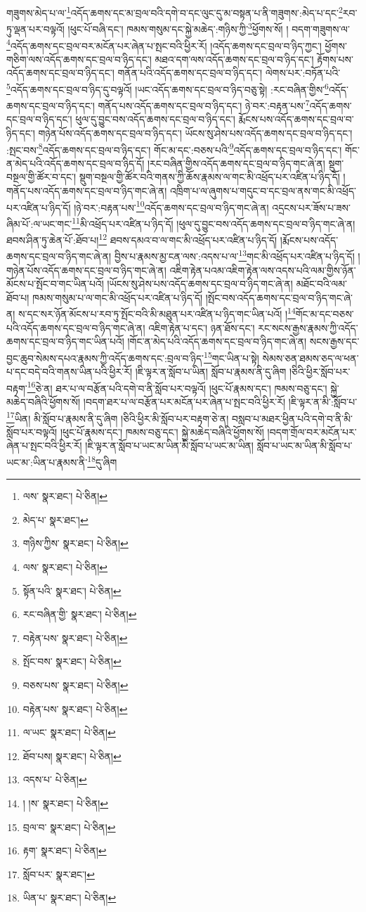 གཟུགས་མེད་པ་ལ་\footnote{ལས་  སྣར་ཐང་།  པེ་ཅིན། }འདོད་ཆགས་དང་མ་བྲལ་བའི་དགེ་བ་དང་ལུང་དུ་མ་བསྟན་པ་ནི་གཟུགས་:མེད་པ་དང་\footnote{མེད་པ་  སྣར་ཐང་། }རབ་ཏུ་ལྡན་པར་བལྟའོ། །ཕུང་པོ་བཞི་དང་། ཁམས་གསུམ་དང་སྐྱེ་མཆེད་:གཉིས་ཀྱི་\footnote{གཉིས་ཀྱིས་  སྣར་ཐང་།  པེ་ཅིན། }ཕྱོགས་སོ། །
བདག་གཟུགས་ལ་\footnote{ལས་  སྣར་ཐང་།  པེ་ཅིན། }འདོད་ཆགས་དང་བྲལ་བར་མངོན་པར་ཞེན་པ་སྤང་བའི་ཕྱིར་རོ། །འདོད་ཆགས་དང་བྲལ་བ་ཉིད་ཀྱང་། ཕྱོགས་གཅིག་ལས་འདོད་ཆགས་དང་བྲལ་བ་ཉིད་དང་། མཐའ་དག་ལས་འདོད་ཆགས་དང་བྲལ་བ་ཉིད་དང་། རྟོགས་པས་འདོད་ཆགས་དང་བྲལ་བ་ཉིད་དང་། གནོན་པའི་འདོད་ཆགས་དང་བྲལ་བ་ཉིད་དང་། ལེགས་པར་:བཏོན་པའི་\footnote{སྟོན་པའི་  སྣར་ཐང་།  པེ་ཅིན། }འདོད་ཆགས་དང་བྲལ་བ་ཉིད་དུ་བལྟའོ། །ཡང་འདོད་ཆགས་དང་བྲལ་བ་ཉིད་བཅུ་སྟེ། :རང་བཞིན་གྱིས་\footnote{རང་བཞིན་གྱི་  སྣར་ཐང་།  པེ་ཅིན། }འདོད་ཆགས་དང་བྲལ་བ་ཉིད་དང་། གནོད་པས་འདོད་ཆགས་དང་བྲལ་བ་ཉིད་དང་། ཉེ་བར་:བརྟན་པས་\footnote{བརྟེན་པས་  སྣར་ཐང་།  པེ་ཅིན། }འདོད་ཆགས་དང་བྲལ་བ་ཉིད་དང་། ཕུལ་དུ་བྱུང་བས་འདོད་ཆགས་དང་བྲལ་བ་ཉིད་དང་། རྨོངས་པས་འདོད་ཆགས་དང་བྲལ་བ་ཉིད་དང་། གཉེན་པོས་འདོད་ཆགས་དང་བྲལ་བ་ཉིད་དང་། ཡོངས་སུ་ཤེས་པས་འདོད་ཆགས་དང་བྲལ་བ་ཉིད་དང་། :སྤང་བས་\footnote{སྤོང་བས་  སྣར་ཐང་།  པེ་ཅིན། }འདོད་ཆགས་དང་བྲལ་བ་ཉིད་དང་། གོང་མ་དང་:བཅས་པའི་\footnote{བཅས་པས་  སྣར་ཐང་།  པེ་ཅིན། }འདོད་ཆགས་དང་བྲལ་བ་ཉིད་དང་། གོང་ན་མེད་པའི་འདོད་ཆགས་དང་བྲལ་བ་ཉིད་དོ། །རང་བཞིན་གྱིས་འདོད་ཆགས་དང་བྲལ་བ་ཉིད་གང་ཞེ་ན། སྡུག་བསྔལ་གྱི་ཚོར་བ་དང་། སྡུག་བསྔལ་གྱི་ཚོར་བའི་གནས་ཀྱི་ཆོས་རྣམས་ལ་གང་མི་འཕྲོད་པར་འཛིན་པ་ཉིད་དོ། །གནོད་པས་འདོད་ཆགས་དང་བྲལ་བ་ཉིད་གང་ཞེ་ན། འཁྲིག་པ་ལ་ཞུགས་པ་གདུང་བ་དང་བྲལ་ནས་གང་མི་འཕྲོད་པར་འཛིན་པ་ཉིད་དོ། །ཉེ་བར་:བརྟན་པས་\footnote{བརྟེན་པས་  སྣར་ཐང་།  པེ་ཅིན། }འདོད་ཆགས་དང་བྲལ་བ་ཉིད་གང་ཞེ་ན། འདྲངས་པར་ཟོས་པ་ཟས་ཞིམ་པོ་:ལ་ཡང་གང་\footnote{ལ་ཡང་  སྣར་ཐང་།  པེ་ཅིན། }མི་འཕྲོད་པར་འཛིན་པ་ཉིད་དོ། །ཕུལ་དུ་བྱུང་བས་འདོད་ཆགས་དང་བྲལ་བ་ཉིད་གང་ཞེ་ན། ཐབས་ཤིན་ཏུ་ཆེན་པོ་:ཐོབ་པ།\footnote{ཐོབ་པས།  སྣར་ཐང་།  པེ་ཅིན། } ཐབས་དམའ་བ་ལ་གང་མི་འཕྲོད་པར་འཛིན་པ་ཉིད་དོ། །རྨོངས་པས་འདོད་ཆགས་དང་བྲལ་བ་ཉིད་གང་ཞེ་ན། བྱིས་པ་རྣམས་མྱ་ངན་ལས་:འདས་པ་ལ་\footnote{འདས་པ་  པེ་ཅིན། }གང་མི་འཕྲོད་པར་འཛིན་པ་ཉིད་དོ། །གཉེན་པོས་འདོད་ཆགས་དང་བྲལ་བ་ཉིད་གང་ཞེ་ན། འཇིག་རྟེན་པའམ་འཇིག་རྟེན་ལས་འདས་པའི་ལམ་གྱིས་ཉོན་མོངས་པ་སྤོང་བ་གང་ཡིན་པའོ། །ཡོངས་སུ་ཤེས་པས་འདོད་ཆགས་དང་བྲལ་བ་ཉིད་གང་ཞེ་ན། མཐོང་བའི་ལམ་ཐོབ་པ། ཁམས་གསུམ་པ་ལ་གང་མི་འཕྲོད་པར་འཛིན་པ་ཉིད་དོ། །སྤོང་བས་འདོད་ཆགས་དང་བྲལ་བ་ཉིད་གང་ཞེ་ན། ས་དང་སར་ཉོན་མོངས་པ་རབ་ཏུ་སྤོང་བའི་མི་མཐུན་པར་འཛིན་པ་ཉིད་གང་ཡིན་པའོ། །\footnote{། །ས་  སྣར་ཐང་།  པེ་ཅིན། }གོང་མ་དང་བཅས་པའི་འདོད་ཆགས་དང་བྲལ་བ་ཉིད་གང་ཞེ་ན། འཇིག་རྟེན་པ་དང་། ཉན་ཐོས་དང་། རང་སངས་རྒྱས་རྣམས་ཀྱི་འདོད་ཆགས་དང་བྲལ་བ་ཉིད་གང་ཡིན་པའོ། །གོང་ན་མེད་པའི་འདོད་ཆགས་དང་བྲལ་བ་ཉིད་གང་ཞེ་ན། སངས་རྒྱས་དང་བྱང་ཆུབ་སེམས་དཔའ་རྣམས་ཀྱི་འདོད་ཆགས་དང་:བྲལ་བ་ཉིད་\footnote{བྲལ་བ་  སྣར་ཐང་།  པེ་ཅིན། }གང་ཡིན་པ་སྟེ། སེམས་ཅན་ཐམས་ཅད་ལ་ཕན་པ་དང་བདེ་བའི་གནས་ཡིན་པའི་ཕྱིར་རོ། །ཇི་ལྟར་ན་སློབ་པ་ཡིན། སློབ་པ་རྣམས་ནི་དུ་ཞིག །ཅིའི་ཕྱིར་སློབ་པར་བརྟག་\footnote{རྟག་  སྣར་ཐང་།  པེ་ཅིན། }ཅེ་ན། ཐར་པ་ལ་བརྩོན་པའི་དགེ་བ་ནི་སློབ་པར་བལྟའོ། །ཕུང་པོ་རྣམས་དང་། ཁམས་བཅུ་དང་། སྐྱེ་མཆེད་བཞིའི་ཕྱོགས་སོ། །བདག་ཐར་པ་ལ་བརྩོན་པར་མངོན་པར་ཞེན་པ་སྤང་བའི་ཕྱིར་རོ། །ཇི་ལྟར་ན་མི་:སློབ་པ་\footnote{སློབ་པར་  སྣར་ཐང་། }ཡིན། མི་སློབ་པ་རྣམས་ནི་དུ་ཞིག །ཅིའི་ཕྱིར་མི་སློབ་པར་བརྟག་ཅེ་ན། བསླབ་པ་མཐར་ཕྱིན་པའི་དགེ་བ་ནི་མི་སློབ་པར་བལྟའོ། །ཕུང་པོ་རྣམས་དང་། ཁམས་བཅུ་དང་། སྐྱེ་མཆེད་བཞིའི་ཕྱོགས་སོ། །བདག་གྲོལ་བར་མངོན་པར་ཞེན་པ་སྤང་བའི་ཕྱིར་རོ། །ཇི་ལྟར་ན་སློབ་པ་ཡང་མ་ཡིན་མི་སློབ་པ་ཡང་མ་ཡིན། སློབ་པ་ཡང་མ་ཡིན་མི་སློབ་པ་ཡང་མ་:ཡིན་པ་རྣམས་ནི་\footnote{ཡིན་པ་  སྣར་ཐང་།  པེ་ཅིན། }དུ་ཞིག 